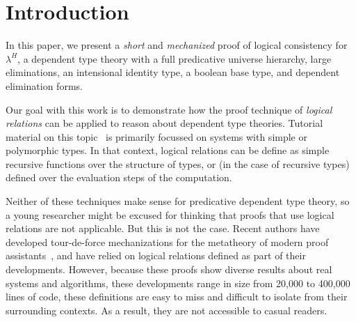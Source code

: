 \documentclass[acmsmall,screen=true,
\ifpublic review=false\else,review=true\fi
  ,anonymous=\ifanonymous true\else false\fi]{acmart}
\newcommand{\lang}{$\lambda^H$\xspace}
\newcommand{\scw}[1]{}
\newcommand{\yl}[1]{}
\begin{document}
\maketitle

\section{Introduction}
In this paper, we present a \emph{short} and \emph{mechanized} proof of
logical consistency for \lang{}, a dependent type theory with a full
predicative universe hierarchy, large eliminations, an intensional identity
type, a boolean base type, and dependent elimination forms.

Our goal with this work is to demonstrate how the proof technique of
\emph{logical relations} can be applied to reason about dependent type theories.
Tutorial material on this topic~\cite{lr-tutorials} is primarily focussed on
systems with simple or polymorphic types. In that context, logical relations
can be define as simple recursive functions over the structure of types, or
(in the case of recursive types) defined over the evaluation steps of the
computation.

Neither of these techniques make sense for predicative dependent type theory,
so a young researcher might be excused for thinking that proofs that use
logical relations are not applicable.  \scw{Well, actually, we did use a
  step-indexed relation for Trellys\ldots}\yl{The core calculus of Trellys'
  logical fragment is simple type + identity so I don't think that counts..}
But this is not the case. Recent authors have developed tour-de-force
mechanizations for the metatheory of modern proof
assistants~\citep{nbeincoq,decagda,martin-lof-a-la-coq,anand2014towards}, and
have relied on logical relations defined as part of their
developments. However, because these proofs show diverse results about real
systems and algorithms, these developments range in size from 20,000 to
400,000 lines of code, these definitions are easy to miss and difficult to
isolate from their surrounding contexts. As a result, they are not accessible
to casual readers.
\end{document}

